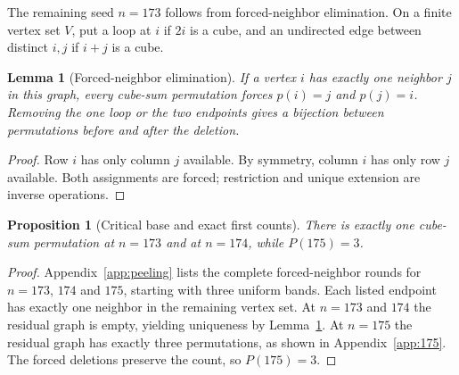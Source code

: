 \documentclass[9pt]{extarticle}
\newtheorem{lemma}[theorem]{Lemma}
\newtheorem{proposition}[theorem]{Proposition}
\begin{document}
The remaining seed $n=173$ follows from forced-neighbor elimination. On a finite vertex set $V$, put a loop at $i$ if $2i$ is a cube, and an undirected edge between distinct $i,j$ if $i+j$ is a cube.
\begin{lemma}[Forced-neighbor elimination]\label{lem:leaf}
If a vertex $i$ has exactly one neighbor $j$ in this graph, every cube-sum permutation forces $p(i)=j$ and $p(j)=i$. Removing the one loop or the two endpoints gives a bijection between permutations before and after the deletion.
\end{lemma}
\begin{proof}
Row $i$ has only column $j$ available. By symmetry, column $i$ has only row $j$ available. Both assignments are forced; restriction and unique extension are inverse operations.
\end{proof}
\begin{proposition}[Critical base and exact first counts]\label{prop:173}
There is exactly one cube-sum permutation at $n=173$ and at $n=174$, while $P(175)=3$.
\end{proposition}
\begin{proof}
Appendix~\ref{app:peeling} lists the complete forced-neighbor rounds for
$n=173$, $174$ and $175$, starting with three uniform bands. Each listed
endpoint has exactly one neighbor in the remaining vertex set.
At $n=173$ and $174$ the residual graph is empty, yielding uniqueness by
Lemma~\ref{lem:leaf}. At $n=175$ the residual graph has exactly three
permutations, as shown in Appendix~\ref{app:175}. The forced deletions
preserve the count, so $P(175)=3$.
\end{proof}
\end{document}
